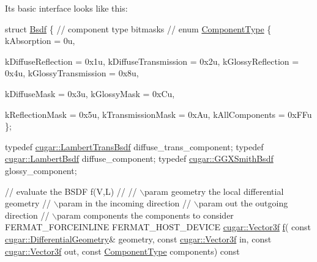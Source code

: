 \begin{DoxyParagraph}{}
Its basic interface looks like this\+: ~\newline

\begin{DoxyCode}
\textcolor{keyword}{struct }\hyperlink{struct_bsdf}{Bsdf}
\{
   \textcolor{comment}{// component type bitmasks}
   \textcolor{comment}{//}
   \textcolor{keyword}{enum} \hyperlink{struct_bsdf_a5f7db6f81220ed9ee6da109d6eb5b585}{ComponentType}
   \{
       kAbsorption             = 0u,

       kDiffuseReflection      = 0x1u,
       kDiffuseTransmission    = 0x2u,
       kGlossyReflection       = 0x4u,
       kGlossyTransmission     = 0x8u,

       kDiffuseMask            = 0x3u,
       kGlossyMask             = 0xCu,

       kReflectionMask         = 0x5u,
       kTransmissionMask       = 0xAu,
       kAllComponents          = 0xFFu
   \};

   \textcolor{keyword}{typedef} \hyperlink{structcugar_1_1_lambert_trans_bsdf}{cugar::LambertTransBsdf} diffuse\_trans\_component;
   \textcolor{keyword}{typedef} \hyperlink{structcugar_1_1_lambert_bsdf}{cugar::LambertBsdf}      diffuse\_component;
   \textcolor{keyword}{typedef} \hyperlink{structcugar_1_1_g_g_x_smith_bsdf}{cugar::GGXSmithBsdf}     glossy\_component;

   \textcolor{comment}{// evaluate the BSDF f(V,L)}
   \textcolor{comment}{//}
   \textcolor{comment}{// \(\backslash\)param geometry              the local differential geometry}
   \textcolor{comment}{// \(\backslash\)param in                    the incoming direction}
   \textcolor{comment}{// \(\backslash\)param out                   the outgoing direction}
   \textcolor{comment}{// \(\backslash\)param components            the components to consider}
   FERMAT\_FORCEINLINE FERMAT\_HOST\_DEVICE
   \hyperlink{structcugar_1_1_vector}{cugar::Vector3f} \hyperlink{struct_bsdf_a58f402b71508cb422ebe3f0e628fd2fd}{f}(
       \textcolor{keyword}{const} \hyperlink{structcugar_1_1_differential_geometry}{cugar::DifferentialGeometry}&  geometry,
       \textcolor{keyword}{const} \hyperlink{structcugar_1_1_vector}{cugar::Vector3f}               in,
       \textcolor{keyword}{const} \hyperlink{structcugar_1_1_vector}{cugar::Vector3f}               out,
       \textcolor{keyword}{const} \hyperlink{struct_bsdf_a5f7db6f81220ed9ee6da109d6eb5b585}{ComponentType}                 components) \textcolor{keyword}{const}


\end{DoxyCode}
\end{DoxyParagraph}
